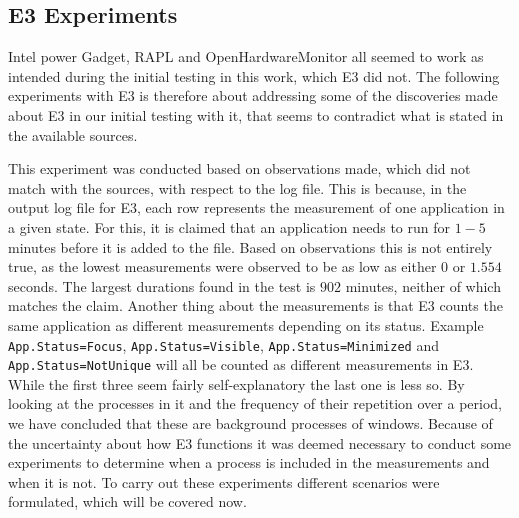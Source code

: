\subsection{E3 Experiments}

Intel power Gadget, RAPL and OpenHardwareMonitor all seemed to work as intended during the initial testing in this work, which E3 did not. The following experiments with E3 is therefore about addressing some of the discoveries made about E3 in our initial testing with it, that seems to contradict what is stated in the available sources\cite[]{E3Doc,E3Video,E3WinHec}. 

This experiment was conducted based on observations made, which did not match with the sources, with respect to the log file. This is because, in the output log file for E3, each row represents the measurement of one application in a given state. For this, it is claimed that an application needs to run for $1-5$ minutes before it is added to the file. Based on observations this is not entirely true, as the lowest measurements were observed to be as low as either $0$ or $1.554$ seconds. The largest durations found in the test is $902$ minutes, neither of which matches the claim. Another thing about the measurements is that E3 counts the same application as different measurements depending on its status.
Example \texttt{App.Status=Focus}, \texttt{App.Status=Visible}, \texttt{App.Status=Minimized} and \texttt{App.Status=NotUnique} will all be counted as different measurements in E3. While the first three seem fairly self-explanatory the last one is less so. By looking at the processes in it and the frequency of their repetition over a period, we have concluded that these are background processes of windows. 
Because of the uncertainty about how E3 functions it was deemed necessary to conduct some experiments to determine when a process is included in the measurements and when it is not. To carry out these experiments different scenarios were formulated, which will be covered now.

